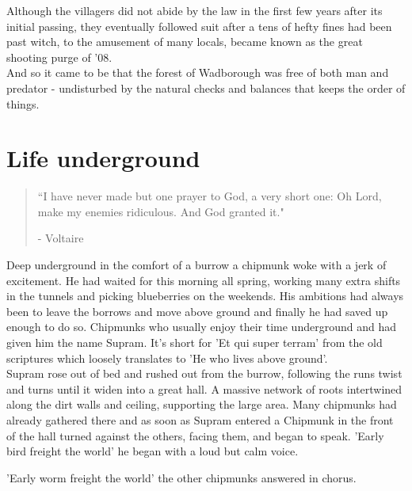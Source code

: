 \documentclass[smalldemyvopaper,11pt,twoside,onecolumn,openright,extrafontsizes]{memoir}
\begin{document}
Although the villagers did not abide by the law in the first few years after its initial passing, they eventually followed suit after a tens of hefty fines had been past witch, to the amusement of many locals, became known as the great shooting purge of '08.\\

And so it came to be that the forest of Wadborough was free of both man and predator - undisturbed by the natural checks and balances that keeps the order of things.

\chapter{Life underground}

\vspace{-1.3cm}
\begin{localsize}{10}
	\begin{quote}
		“I have never made but one prayer to God, a very short one: Oh Lord, make my enemies ridiculous. And God granted it."
		\begin{flushright}- Voltaire \end{flushright}
	\end{quote}
\end{localsize}
\vspace{1cm}

Deep underground in the comfort of a burrow	a chipmunk woke with a jerk of excitement. He had waited for this morning all spring, working many extra shifts in the tunnels and picking blueberries on the weekends. His ambitions had always been to leave the borrows and move above ground and finally he had saved up enough to do so. Chipmunks who usually enjoy their time underground and had given him the name Supram. It's short for 'Et qui super terram' from the old scriptures which loosely translates to 'He who lives above ground'.\\

Supram rose out of bed and rushed out from the burrow, following the runs twist and turns until it widen into a great hall. A massive network of roots intertwined along the dirt walls and ceiling, supporting the large area. Many chipmunks had already gathered there and as soon as Supram entered a Chipmunk in the front of the hall turned against the others, facing them, and began to speak. 
'Early bird freight the world' he began with a loud but calm voice. 

'Early worm freight the world' the other chipmunks answered in chorus.
\end{document}
